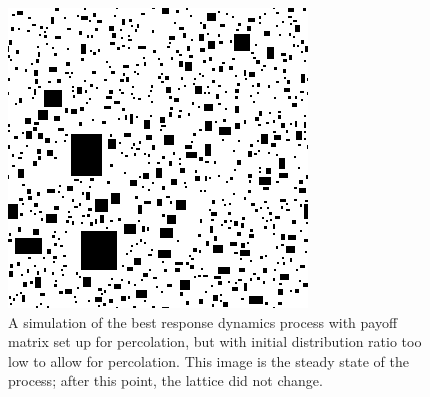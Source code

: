 \documentclass[notitlepage,reqno]{amsart}
\begin{document}
\begin{figure}[h]
\includegraphics[width=.5\textwidth]{./images/Time41-Process7-cities.png}
\caption{
A simulation of the best response dynamics process with payoff matrix
set up for percolation, but with initial distribution ratio too low to
allow for percolation. This image is the steady state of the process;
after this point, the lattice did not change.
}
\label{fig:process8-1to6}
\end{figure}
\end{document}
